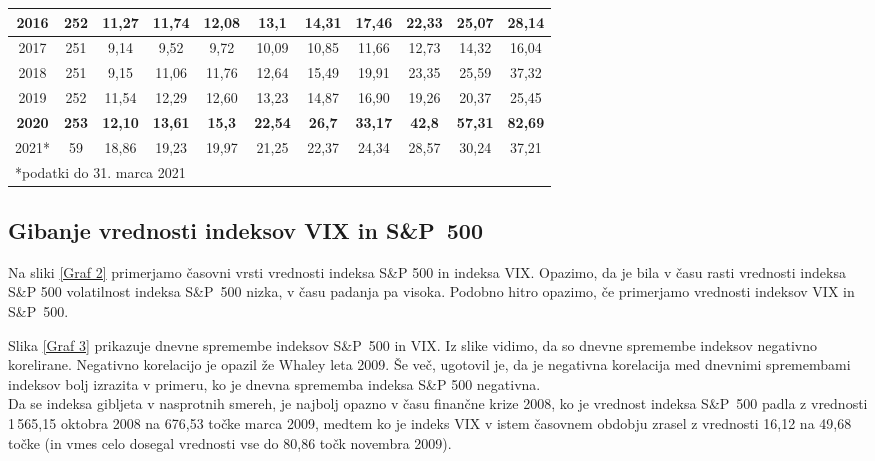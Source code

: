 \documentclass[12pt,a4paper, reqno]{amsart}
\theoremstyle{definition} %
\theoremstyle{plain} %
\begin{document}
\begin{table}[h!]
\begin{adjustbox}{center}
\begin{tabular}{|c|c|c|c|c|c|c|c|c|c|c|}
    \hline
    2016 & 252 & 11,27 & 11,74 & 12,08 & 13,1 & 14,31 & 17,46 & 22,33 & 25,07 & 28,14 \\
    \hline
    2017 & 251 & 9,14 & 9,52 & 9,72 & 10,09 & 10,85 & 11,66 & 12,73 & 14,32 & 16,04 \\
    \hline
    2018 & 251 & 9,15 & 11,06 & 11,76 & 12,64 & 15,49 & 19,91 & 23,35 & 25,59 & 37,32 \\
    \hline
    2019 & 252 & 11,54 & 12,29 & 12,60 & 13,23 & 14,87 & 16,90 & 19,26 & 20,37 & 25,45 \\
    \hline
    \textbf{2020} & \textbf{253} & \textbf{12,10} & \textbf{13,61} & \textbf{15,3} & \textbf{22,54} & \textbf{26,7} & \textbf{33,17} & \textbf{42,8} & \textbf{57,31} & \textbf{82,69} \\
    \hline
    2021* & 59 & 18,86 & 19,23 & 19,97 & 21,25 & 22,37 & 24,34 & 28,57 & 30,24 & 37,21 \\
    \hline
    \multicolumn{11}{l}{*podatki do 31. marca 2021} \\
    \end{tabular}
   \end{adjustbox}{}
\end{table}



\newpage
\subsection{Gibanje vrednosti indeksov VIX in S\&P~500}
Na sliki \ref{Graf 2} primerjamo časovni vrsti vrednosti indeksa S\&P 500 in indeksa VIX. Opazimo, da je bila v času rasti vrednosti indeksa S\&P 500 volatilnost indeksa S\&P~500 nizka, v času padanja pa visoka. Podobno hitro opazimo, če primerjamo vrednosti indeksov VIX in S\&P~500.\

Slika \ref{Graf 3} prikazuje dnevne spremembe indeksov S\&P~500 in VIX. Iz slike vidimo, da so dnevne spremembe indeksov negativno korelirane. Negativno korelacijo je opazil že Whaley \cite{whaley} leta 2009. Še več, ugotovil je, da je negativna korelacija med dnevnimi spremembami indeksov bolj izrazita v primeru, ko je dnevna sprememba indeksa S\&P 500 negativna.\\

Da se indeksa gibljeta v nasprotnih smereh, je najbolj opazno v času finančne krize 2008, ko je vrednost indeksa S\&P~500 padla z vrednosti 1\,565,15 oktobra 2008 na 676,53 točke marca 2009, medtem ko je indeks VIX v istem časovnem obdobju zrasel z vrednosti 16,12 na 49,68 točke (in vmes celo dosegal vrednosti vse do 80,86 točk novembra 2009).\\
\end{document}
